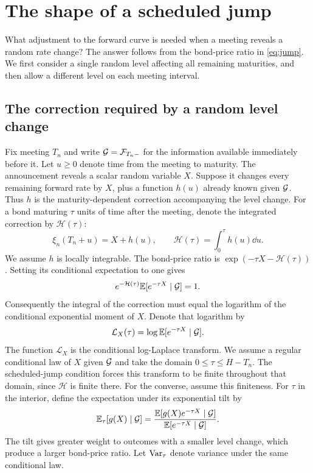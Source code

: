 \section{The shape of a scheduled jump}\label{sec:jumps}
What adjustment to the forward curve is needed when a meeting reveals a random rate change? The answer follows from the bond-price ratio in \eqref{eq:jump}. We first consider a single random level affecting all remaining maturities, and then allow a different level on each meeting interval.

\subsection{The correction required by a random level change}
Fix meeting $T_n$ and write $\mathcal G=\mathcal F_{T_n-}$ for the information available immediately before it. Let $u\ge0$ denote time from the meeting to maturity. The announcement reveals a scalar random variable $X$. Suppose it changes every remaining forward rate by $X$, plus a function $h(u)$ already known given $\mathcal G$. Thus $h$ is the maturity-dependent correction accompanying the level change. For a bond maturing $\tau$ units of time after the meeting, denote the integrated correction by $\mathcal H(\tau)$:
\[
\xi_n(T_n+u)=X+h(u),\qquad \mathcal H(\tau)=\int_0^\tau h(u)\dd u.
\]
We assume $h$ is locally integrable. The bond-price ratio is $\exp(-\tau X-\mathcal H(\tau))$. Setting its conditional expectation to one gives
\[
 e^{-\mathcal H(\tau)}\mathbb E[e^{-\tau X}\mid\mathcal G]=1.
\]
Consequently the integral of the correction must equal the logarithm of the conditional exponential moment of $X$. Denote that logarithm by
\[
\mathcal L_X(\tau)=\log\mathbb E[e^{-\tau X}\mid\mathcal G].
\]
The function $\mathcal L_X$ is the conditional log-Laplace transform. We assume a regular conditional law of $X$ given $\mathcal G$ and take the domain $0\le\tau\le H-T_n$. The scheduled-jump condition forces this transform to be finite throughout that domain, since $\mathcal H$ is finite there. For the converse, assume this finiteness. For $\tau$ in the interior, define the expectation under its exponential tilt by
\[
\mathbb E_\tau[g(X)\mid\mathcal G]
 =\frac{\mathbb E[g(X)e^{-\tau X}\mid\mathcal G]}{\mathbb E[e^{-\tau X}\mid\mathcal G]}.
\]
The tilt gives greater weight to outcomes with a smaller level change, which produce a larger bond-price ratio. Let $\operatorname{Var}_\tau$ denote variance under the same conditional law.

